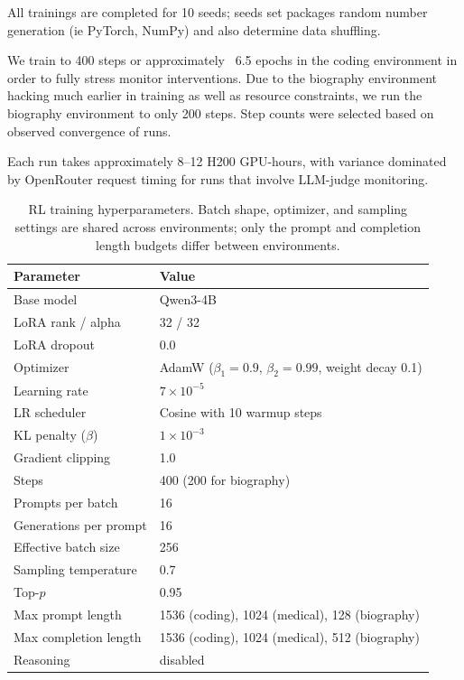 \documentclass{article}
\begin{document}
All trainings are completed for 10 seeds; seeds set packages random number generation (ie PyTorch, NumPy) and also determine data shuffling.

We train to 400 steps or approximately ~6.5 epochs in the coding environment in order to fully stress monitor interventions. Due to the biography environment hacking much earlier in training as well as resource constraints, we run the biography environment to only 200 steps. Step counts were selected based on observed convergence of runs. 

Each run takes approximately 8--12 H200 GPU-hours, with variance dominated by OpenRouter request timing for runs that involve LLM-judge monitoring.

\begin{table}[h!]
\centering
\begin{tabular}{ll}
\toprule
\textbf{Parameter} & \textbf{Value} \\
\midrule
Base model & Qwen3-4B \\
LoRA rank / alpha & 32 / 32 \\
LoRA dropout & 0.0 \\
\midrule
Optimizer & AdamW ($\beta_1{=}0.9$, $\beta_2{=}0.99$, weight decay 0.1) \\
Learning rate & $7 \times 10^{-5}$ \\
LR scheduler & Cosine with 10 warmup steps \\
KL penalty ($\beta$) & $1 \times 10^{-3}$ \\
Gradient clipping & 1.0 \\
\midrule
Steps & 400 (200 for biography)\\
Prompts per batch & 16 \\
Generations per prompt & 16 \\
Effective batch size & 256 \\
\midrule
Sampling temperature & 0.7 \\
Top-$p$ & 0.95 \\
Max prompt length & 1536 (coding), 1024 (medical), 128 (biography) \\
Max completion length & 1536 (coding), 1024 (medical), 512 (biography) \\
Reasoning & disabled \\
\bottomrule
\end{tabular}
\vspace{0.5em}
\caption{RL training hyperparameters. Batch shape, optimizer, and sampling settings are shared across environments; only the prompt and completion length budgets differ between environments.}
\label{tab:training_hyperparameters}
\end{table}
\end{document}
